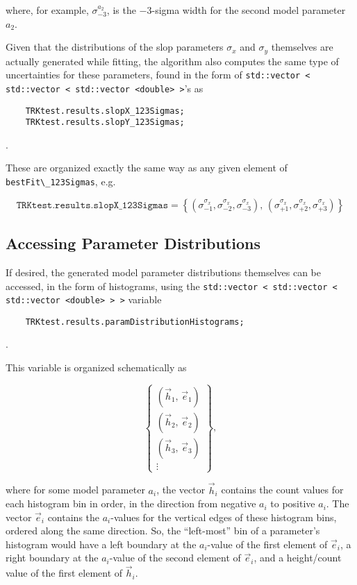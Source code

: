 \documentclass[12pt]{article}
\newcommand{\li}{\lstinline}
\begin{document}
where, for example, $\sigma_{-3}^{a_2}$, is the $-3$-sigma width for the second model parameter $a_2$.

Given that the distributions of the slop parameters $\sigma_x$ and $\sigma_y$ themselves are actually generated while fitting, the algorithm also computes the same type of uncertainties for these parameters, found in the form of \li{std::vector < std::vector < std::vector <double> >}'s as

\begin{lstlisting}
    TRKtest.results.slopX_123Sigmas;
    TRKtest.results.slopY_123Sigmas;
\end{lstlisting}.

These are organized exactly the same way as any given element of \li{bestFit\_123Sigmas}, e.g.

\begin{equation}
    \texttt{TRKtest.results.slopX\_123Sigmas} = \left\{\left(\sigma_{-1}^{\sigma_x}, \sigma_{-2}^{\sigma_x}, \sigma_{-3}^{\sigma_x}\right), \, \left(\sigma_{+1}^{\sigma_x}, \sigma_{+2}^{\sigma_x}, \sigma_{+3}^{\sigma_x}\right)\right\}
\end{equation}

\subsection{Accessing Parameter Distributions}

If desired, the generated model parameter distributions themselves can be accessed, in the form of histograms, using the \li{std::vector < std::vector < std::vector <double> > >} variable

\begin{lstlisting}
    TRKtest.results.paramDistributionHistograms;
\end{lstlisting}.

This variable is organized schematically as

\begin{equation}
    \begin{Bmatrix}
        \left(\vec{h}_{1}, \, \vec{e}_{1}\right) \\
        \left(\vec{h}_{2}, \, \vec{e}_{2}\right) \\
        \left(\vec{h}_{3}, \, \vec{e}_{3}\right) \\
        \vdots
    \end{Bmatrix},
\end{equation}

where for some model parameter $a_i$, the vector $\vec{h}_i$ contains the count values for each histogram bin in order, in the direction from negative $a_i$ to positive $a_i$. The vector $\vec{e}_i$ contains the $a_i$-values for the vertical edges of these histogram bins, ordered along the same direction. So, the ``left-most'' bin of a parameter's histogram would have a left boundary at the $a_i$-value of the first element of $\vec{e}_i$, a right boundary at the $a_i$-value of the second element of $\vec{e}_i$, and a height/count value of the first element of $\vec{h}_i$.
\end{document}
